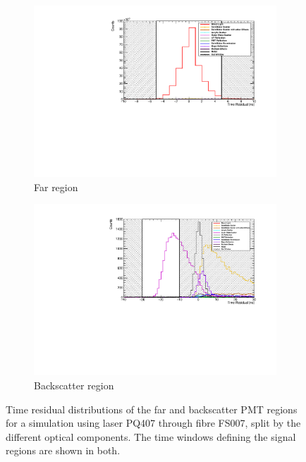 \begin{figure}
    \centering
    \begin{subfigure}{0.98\textwidth}
        \centering
        \includegraphics[width=\textwidth]{5_SMELLIEAnalysis/images/far_pmts_tres_components_nice_PQ407_FS007.pdf}
        \caption{Far region}
        \label{fig:smellie_far_PMT_selection}
    \end{subfigure}
    \begin{subfigure}{0.98\textwidth}
        \centering
        \includegraphics[width=\textwidth]{5_SMELLIEAnalysis/images/backscatter_pmts_tres_components_nice_PQ407_FS007.pdf}
        \caption{Backscatter region}
        \label{fig:smellie_backscat_PMT_selection}
    \end{subfigure}
    \caption[Time residual distributions of the far and backscatter PMT regions for a simulation using laser PQ407 through fibre FS007, split by the different optical components]
    {Time residual distributions of the far and backscatter PMT regions for a simulation using laser PQ407 through fibre FS007, split by the different optical components. The time windows defining the signal regions are shown in both.}
    \label{fig:smellie_extlength_PMT_selections}
\end{figure}

